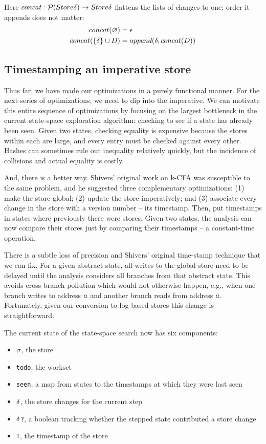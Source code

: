 \documentclass[preprint,onecolumn,9pt]{sigplanconf} %
\begin{document}
Here $concat : \mathcal{P}(Store\delta) \to Store\delta$ flattens the lists
of changes to one; order it appends does not matter:
\begin{align*}
concat(\varnothing) &= \epsilon \\
concat(\{\delta\}\cup D) &= append(\delta, concat(D))
\end{align*}


\subsection{Timestamping an imperative store}

Thus far, we have made our optimizations in a purely functional
manner. For the next series of optimizations, we need to dip into the
imperative. We can motivate this entire sequence of optimizations by
focusing on the largest bottleneck in the current state-space
exploration algorithm: checking to see if a state has already been
seen. Given two states, checking equality is expensive because the
stores within each are large, and every entry must be checked against
every other. Hashes can sometimes rule out inequality relatively
quickly, but the incidence of collisions and actual equality is
costly.

And, there is a better way. Shivers' original work on k-CFA was
susceptible to the same problem, and he suggested three complementary
optimizations: (1) make the store global; (2) update the store
imperatively; and (3) associate every change in the store with a
version number -- its timestamp. Then, put timestamps in states
where previously there were stores. Given two states, the analysis can
now compare their stores just by comparing their timestamps -- a
constant-time operation.

There is a subtle loss of precision and Shivers' original time-stamp
technique that we can fix. For a given abstract state, all writes to
the global store need to be delayed until the analysis considers all
branches from that abstract state. This avoids cross-branch pollution
which would not otherwise happen, e.g., when one branch writes to
address $a$ and another branch reads from address
$a$. Fortunately, given our conversion to log-based stores this
change is straightforward.

The current state of the state-space search now has six components:

\begin{itemize}
 \item{{\tt $\sigma$}, the store}
 \item{{\tt todo}, the workset}
 \item{{\tt seen}, a map from states to the timestamps at which they were last seen}
 \item{{\tt $\delta$}, the store changes for the current step}
 \item{{\tt $\delta$?}, a boolean tracking whether the stepped state contributed a store change}
 \item{{\tt T}, the timestamp of the store}
\end{itemize}
\end{document}

